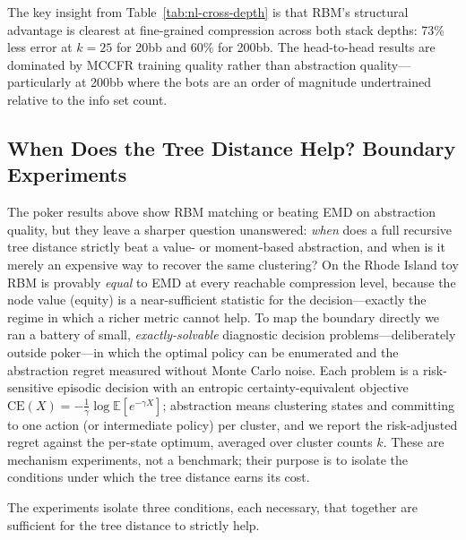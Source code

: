 \documentclass[11pt]{article}
\begin{document}
The key insight from Table~\ref{tab:nl-cross-depth} is that RBM's
structural advantage is clearest at fine-grained compression across
both stack depths: 73\% less error at $k{=}25$ for 20bb and 60\% for
200bb. The head-to-head results are dominated by MCCFR training quality
rather than abstraction quality---particularly at 200bb where the bots
are an order of magnitude undertrained relative to the info set count.

\subsection{When Does the Tree Distance Help? Boundary Experiments}
\label{sec:boundary}

The poker results above show RBM matching or beating EMD on abstraction
quality, but they leave a sharper question unanswered: \emph{when} does
a full recursive tree distance strictly beat a value- or
moment-based abstraction, and when is it merely an expensive way to
recover the same clustering? On the Rhode Island toy RBM is provably
\emph{equal} to EMD at every reachable compression level, because the
node value (equity) is a near-sufficient statistic for the
decision---exactly the regime in which a richer metric cannot help. To
map the boundary directly we ran a battery of small,
\emph{exactly-solvable} diagnostic decision problems---deliberately
outside poker---in which the optimal policy can be enumerated and the
abstraction regret measured without Monte Carlo noise. Each problem is
a risk-sensitive episodic decision with an entropic certainty-equivalent
objective $\mathrm{CE}(X) = -\tfrac{1}{\gamma}\log\mathbb{E}[e^{-\gamma
X}]$; abstraction means clustering states and committing to one action
(or intermediate policy) per cluster, and we report the risk-adjusted
regret against the per-state optimum, averaged over cluster counts $k$.
These are mechanism experiments, not a benchmark; their purpose is to
isolate the conditions under which the tree distance earns its cost.

The experiments isolate three conditions, each necessary, that together
are sufficient for the tree distance to strictly help.
\end{document}
